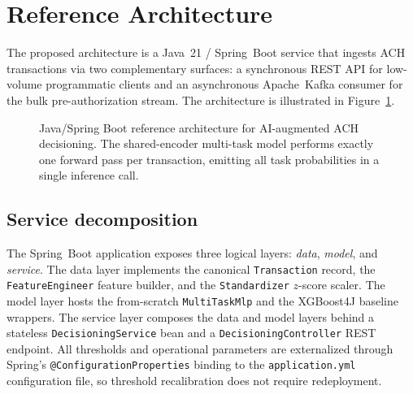 \documentclass[11pt,a4paper]{article}
\begin{document}
\section{Reference Architecture}
\label{sec:arch}

The proposed architecture is a Java~21 / Spring~Boot service that ingests
ACH transactions via two complementary surfaces: a synchronous REST API
for low-volume programmatic clients and an asynchronous Apache~Kafka
consumer for the bulk pre-authorization stream. The architecture is
illustrated in Figure~\ref{fig:arch}.

\begin{figure}[t]
    \centering
    \caption{Java/Spring Boot reference architecture for AI-augmented ACH
    decisioning. The shared-encoder multi-task model performs exactly one
    forward pass per transaction, emitting all task probabilities in a
    single inference call.}
    \label{fig:arch}
\end{figure}

\subsection{Service decomposition}
The Spring~Boot application exposes three logical layers:
\textit{data}, \textit{model}, and \textit{service}. The data layer
implements the canonical \texttt{Transaction} record, the
\texttt{FeatureEngineer} feature builder, and the \texttt{Standardizer}
$z$-score scaler. The model layer hosts the from-scratch
\texttt{MultiTaskMlp} and the XGBoost4J baseline wrappers. The service
layer composes the data and model layers behind a stateless
\texttt{DecisioningService} bean and a \texttt{DecisioningController}
REST endpoint. All thresholds and operational parameters are
externalized through Spring's \texttt{@ConfigurationProperties}
binding to the \texttt{application.yml} configuration file, so threshold
recalibration does not require redeployment.
\end{document}
